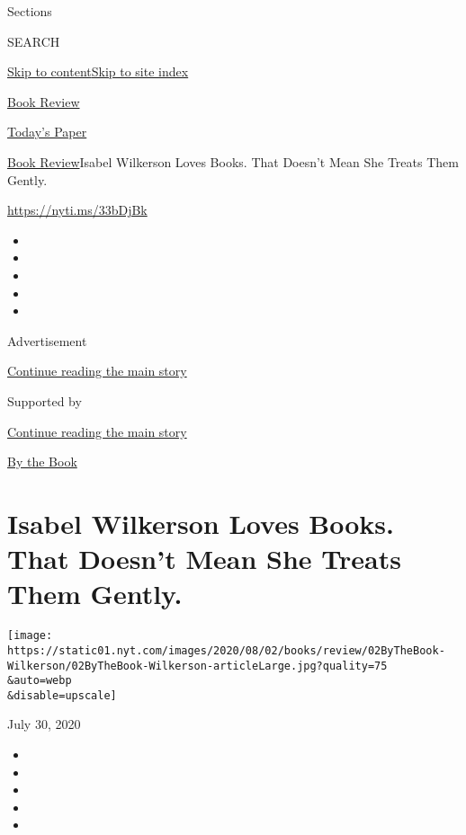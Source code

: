 Sections

SEARCH

\protect\hyperlink{site-content}{Skip to
content}\protect\hyperlink{site-index}{Skip to site index}

\href{https://www.nytimes.com/section/books/review}{Book Review}

\href{https://myaccount.nytimes.com/auth/login?response_type=cookie\&client_id=vi}{}

\href{https://www.nytimes.com/section/todayspaper}{Today's Paper}

\href{/section/books/review}{Book Review}\textbar{}Isabel Wilkerson
Loves Books. That Doesn't Mean She Treats Them Gently.

\url{https://nyti.ms/33bDjBk}

\begin{itemize}
\item
\item
\item
\item
\item
\end{itemize}

Advertisement

\protect\hyperlink{after-top}{Continue reading the main story}

Supported by

\protect\hyperlink{after-sponsor}{Continue reading the main story}

\href{/column/by-the-book}{By the Book}

\hypertarget{isabel-wilkerson-loves-books-that-doesnt-mean-she-treats-them-gently}{%
\section{Isabel Wilkerson Loves Books. That Doesn't Mean She Treats Them
Gently.}\label{isabel-wilkerson-loves-books-that-doesnt-mean-she-treats-them-gently}}

\texttt{[image: https://static01.nyt.com/images/2020/08/02/books/review/02ByTheBook-Wilkerson/02ByTheBook-Wilkerson-articleLarge.jpg?quality=75\\\&auto=webp\\\&disable=upscale]}

July 30, 2020

\begin{itemize}
\item
\item
\item
\item
\item
\end{itemize}

